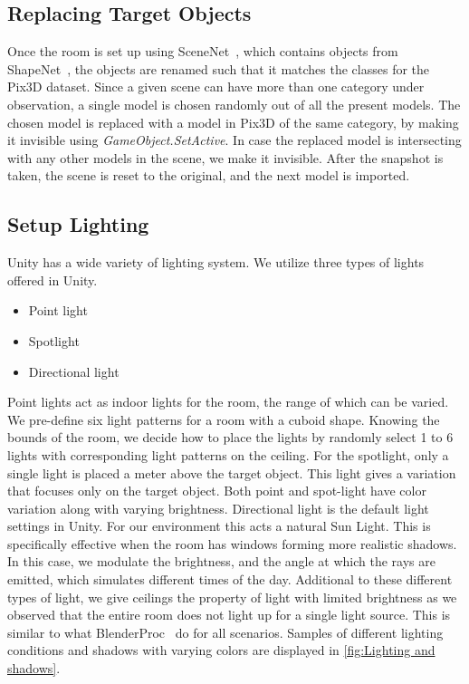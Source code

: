 \subsection{Replacing Target Objects}\label{subsec:implementation_replacing-target-objects}
Once the room is set up using SceneNet~\cite{McCormac2017}, which contains objects from ShapeNet~\cite{shapenet2015}, the objects are renamed such that it matches the classes for the Pix3D dataset.
Since a given scene can have more than one category under observation, a single model is chosen randomly out of all the present models.
The chosen model is replaced with a model in Pix3D of the same category, by making it invisible using \emph{GameObject.SetActive}.
In case the replaced model is intersecting with any other models in the scene, we make it invisible.
After the snapshot is taken, the scene is reset to the original, and the next model is imported.


\subsection{Setup Lighting}\label{subsec:implementation_lighting}

Unity has a wide variety of lighting system.
We utilize three types of lights offered in Unity.

\begin{itemize}
    \item Point light
    \item Spotlight
    \item Directional light
\end{itemize}

Point lights act as indoor lights for the room, the range of which can be varied.
We pre-define six light patterns for a room with a cuboid shape.
Knowing the bounds of the room, we decide how to place the lights by randomly select 1 to 6 lights with corresponding light patterns on the ceiling.
For the spotlight, only a single light is placed a meter above the target object.
This light gives a variation that focuses only on the target object.
Both point and spot-light have color variation along with varying brightness.
Directional light is the default light settings in Unity.
For our environment this acts a natural Sun Light.
This is specifically effective when the room has windows forming more realistic shadows.
In this case, we modulate the brightness, and the angle at which the rays are emitted, which simulates different times of the day.
Additional to these different types of light, we give ceilings the property of light with limited brightness as we observed that the entire room does not light up for a single light source.
This is similar to what BlenderProc~\cite{dlr139317} do for all scenarios.
Samples of different lighting conditions and shadows with varying colors are displayed in \autoref{fig:Lighting and shadows}.


